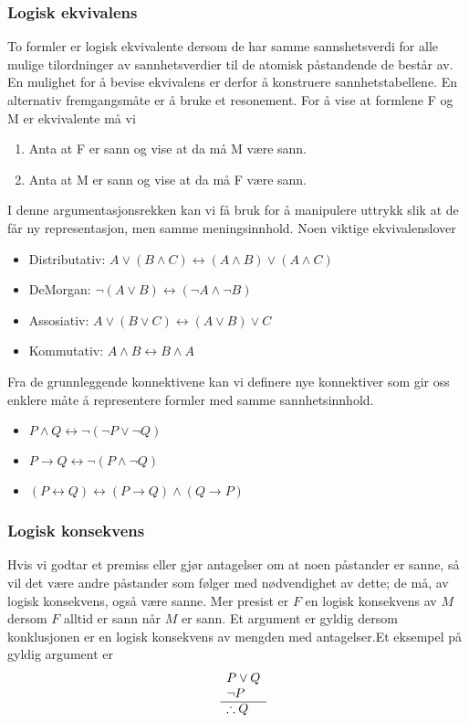 \subsubsection{Logisk ekvivalens}
To formler er logisk ekvivalente dersom de har samme sannshetsverdi for alle mulige tilordninger av sannhetsverdier til de atomisk påstandende de består av. En mulighet for å bevise ekvivalens er derfor å konstruere sannhetstabellene. En alternativ fremgangsmåte er å bruke et resonement. For å vise at formlene F og M er ekvivalente må vi
\begin{enumerate}
\item Anta at F er sann og vise at da må M være sann.
\item Anta at M er sann og vise at da må F være sann.
\end{enumerate}
I denne argumentasjonsrekken kan vi få bruk for å manipulere uttrykk slik at de får ny representasjon, men samme meningsinnhold. Noen viktige ekvivalenslover
\begin{itemize}
\item Distributativ: $A \lor (B \land C) \leftrightarrow (A \land B) \lor (A \land C)$
\item DeMorgan: $\neg (A \lor B) \leftrightarrow (\neg A \land \neg B)$
\item Assosiativ: $A \lor (B \lor C) \leftrightarrow (A \lor B) \lor C$
\item Kommutativ: $A \land B \leftrightarrow B \land A$
\end{itemize}
Fra de grunnleggende konnektivene kan vi definere nye konnektiver som gir oss enklere måte å representere formler med samme sannhetsinnhold.
\begin{itemize}
\item $P\land Q \leftrightarrow \neg(\neg P \lor \neg Q)$
\item $P \rightarrow Q  \leftrightarrow \neg(P\land \neg Q)$
\item $(P \leftrightarrow Q) \leftrightarrow (P \rightarrow Q) \land (Q \rightarrow P)$
\end{itemize}
\subsubsection{Logisk konsekvens}
Hvis vi godtar et premiss eller gjør antagelser om at noen påstander er sanne, så vil det være andre påstander som følger med nødvendighet av dette; de må, av logisk konsekvens, også være sanne. Mer presist er $F$ en logisk konsekvens av $M$ dersom $F$ alltid er sann når $M$ er sann. Et argument er gyldig dersom konklusjonen er en logisk konsekvens av mengden med antagelser.Et eksempel på gyldig argument er
$$
\begin{array}{rl}
    & P \lor Q\\
    & \neg P \\
    \cline{2-2}
    & \therefore  Q
  \end{array}
$$
